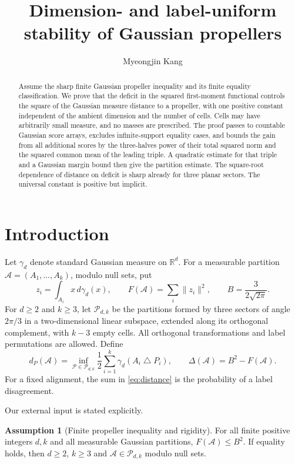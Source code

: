 \documentclass[11pt,reqno]{amsart}
\title[Uniform Gaussian propeller stability]{Dimension- and label-uniform stability of Gaussian propellers}
\author{Myeongjin Kang}
\date{}
\numberwithin{equation}{section}
\theoremstyle{definition}
\newtheorem{assumption}[theorem]{Assumption}
\theoremstyle{remark}
\newcommand{\R}{\mathbb R}
\newcommand{\cP}{\mathcal P}
\begin{document}
\begin{abstract}
Assume the sharp finite Gaussian propeller inequality and its finite
equality classification. We prove that the deficit in the squared
first-moment functional controls the square of the Gaussian measure
distance to a propeller, with one positive constant independent of
the ambient dimension and the number of cells. Cells may have
arbitrarily small measure, and no masses are prescribed. The proof
passes to countable Gaussian score arrays, excludes infinite-support
equality cases, and bounds the gain from all additional scores by the
three-halves power of their total squared norm and the squared common
mean of the leading triple. A quadratic estimate for that triple and
a Gaussian margin bound then give the partition estimate. The
square-root dependence of distance on deficit is sharp already for
three planar sectors. The universal constant is positive but implicit.
\end{abstract}
\maketitle

\section{Introduction}
Let $\gamma_d$ denote standard Gaussian measure on $\R^d$. For a
measurable partition $\mathcal A=(A_1,\ldots,A_k)$, modulo null sets,
put
\[
 z_i=\int_{A_i}x\,d\gamma_d(x),\qquad
 F(\mathcal A)=\sum_i\|z_i\|^2,\qquad B=\frac3{2\sqrt{2\pi}}.
\]
For $d\ge2$ and $k\ge3$, let $\cP_{d,k}$ be the partitions formed
by three sectors of angle $2\pi/3$ in a two-dimensional linear
subspace, extended along its orthogonal complement, with $k-3$
empty cells. All orthogonal transformations and label permutations
are allowed. Define
\begin{equation}\label{eq:distance}
 d_P(\mathcal A)=\inf_{\mathcal P\in\cP_{d,k}}
           \frac12\sum_{i=1}^k\gamma_d(A_i\mathbin\triangle P_i),
 \qquad \Delta(\mathcal A)=B^2-F(\mathcal A).
\end{equation}
For a fixed alignment, the sum in \eqref{eq:distance} is the
probability of a label disagreement.

Our external input is stated explicitly.
\begin{assumption}[Finite propeller inequality and rigidity]\label{ass:finite}
For all finite positive integers $d,k$ and all measurable Gaussian
partitions, $F(\mathcal A)\le B^2$. If equality holds, then
$d\ge2$, $k\ge3$ and $\mathcal A\in\cP_{d,k}$ modulo null sets.
\end{assumption}
\end{document}
